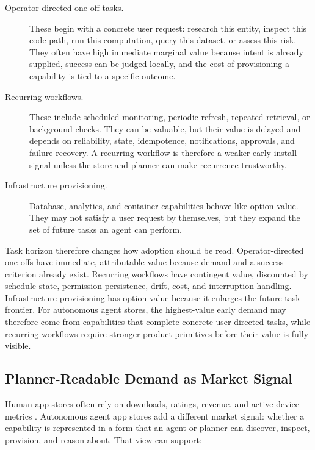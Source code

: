 \documentclass[10pt,twocolumn]{article}
\begin{document}
\begin{description}
    \item[Operator-directed one-off tasks.] These begin with a concrete user request: research this entity, inspect this code path, run this computation, query this dataset, or assess this risk. They often have high immediate marginal value because intent is already supplied, success can be judged locally, and the cost of provisioning a capability is tied to a specific outcome.
    \item[Recurring workflows.] These include scheduled monitoring, periodic refresh, repeated retrieval, or background checks. They can be valuable, but their value is delayed and depends on reliability, state, idempotence, notifications, approvals, and failure recovery. A recurring workflow is therefore a weaker early install signal unless the store and planner can make recurrence trustworthy.
    \item[Infrastructure provisioning.] Database, analytics, and container capabilities behave like option value. They may not satisfy a user request by themselves, but they expand the set of future tasks an agent can perform.
\end{description}

Task horizon therefore changes how adoption should be read. Operator-directed one-offs have immediate, attributable value because demand and a success criterion already exist. Recurring workflows have contingent value, discounted by schedule state, permission persistence, drift, cost, and interruption handling. Infrastructure provisioning has option value because it enlarges the future task frontier. For autonomous agent stores, the highest-value early demand may therefore come from capabilities that complete concrete user-directed tasks, while recurring workflows require stronger product primitives before their value is fully visible.

\subsection{Planner-Readable Demand as Market Signal}

Human app stores often rely on downloads, ratings, revenue, and active-device metrics \cite{harman2012appstoremining,martin2017appstoreanalysis}. Autonomous agent app stores add a different market signal: whether a capability is represented in a form that an agent or planner can discover, inspect, provision, and reason about. That view can support:
\end{document}
